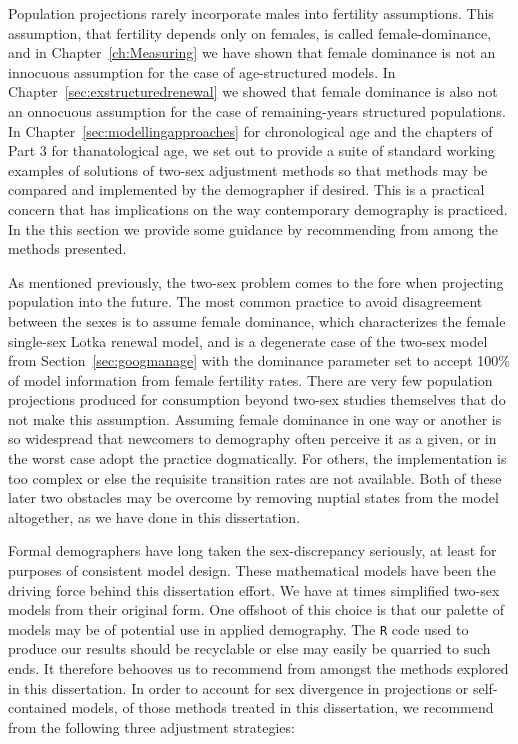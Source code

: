 
Population projections rarely incorporate males into fertility assumptions. This
assumption, that fertility depends only on females, is called female-dominance,
and in Chapter~\ref{ch:Measuring} we have shown that female dominance is not an
innocuous assumption for the case of age-structured models. In
Chapter~\ref{sec:exstructuredrenewal} we showed that female dominance is also
not an onnocuous assumption for the case of remaining-years structured
populations. In Chapter~\ref{sec:modellingapproaches} for chronological age and
the chapters of Part 3 for thanatological age, we set out to provide a suite of
standard working examples of solutions of two-sex adjustment methods so that 
methods may be compared and implemented by the demographer if desired. This 
is a practical concern that has implications on the way
contemporary demography is practiced. In the this section we provide some
guidance by recommending from among the methods presented.

As mentioned previously, the two-sex problem comes to the fore when projecting
population into the future. The most common practice to avoid disagreement between the sexes is to
assume female dominance, which characterizes the female single-sex Lotka
renewal model, and is a degenerate case of the
\citet{goodman1967age} two-sex model from Section~\ref{sec:googmanage} with the
dominance parameter set to accept 100\% of model information from female fertility rates. 
There are very few population projections produced for consumption beyond
two-sex studies themselves that do not make this assumption. Assuming female dominance
in one way or another is so widespread that newcomers to demography often 
perceive it as a given, or in the worst case adopt the
practice dogmatically. For others, the implementation is too complex or
else the requisite transition rates are not available. Both of these later
two obstacles may be overcome by removing nuptial states from the model
altogether, as we have done in this dissertation. 

Formal demographers have long taken the sex-discrepancy seriously, at
least for purposes of consistent model design. These mathematical models
have been the driving force behind this dissertation effort. We have at
times simplified two-sex models from their original form. One offshoot of
this choice is that our palette of models may be of potential use in applied
demography. The \texttt{R} code used to produce our results should be recyclable 
or else may easily be quarried to such ends. It therefore behooves us to recommend from
amongst the methods explored in this dissertation. In order to account for sex
divergence in projections or self-contained models, of those methods treated in this dissertation, 
we recommend from the following three adjustment strategies:

